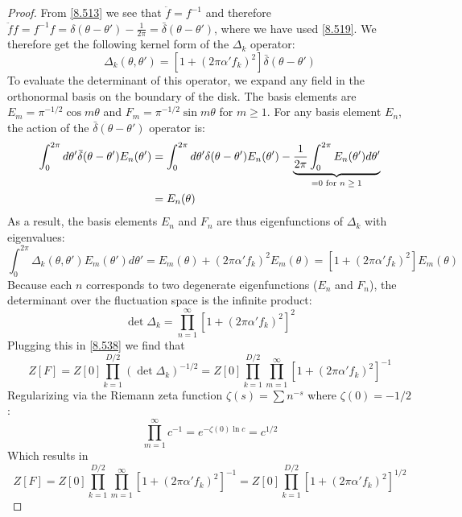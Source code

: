 \begin{tcolorbox}[breakable]
\begin{proof}
			From \eqref{8.513} we see that $\ddot{f} = f^{-1}$ and therefore $\ddot{f} f = f^{-1} f = \delta(\theta - \theta') - \frac{1}{2\pi} = \bar{\delta}(\theta - \theta')$, where we have used \eqref{8.519}. We therefore get the following kernel form of the $\Delta_k$ operator:
			\begin{equation}
				\Delta_k(\theta, \theta') = [1+ (2\pi\alpha' f_k)^2] \bar{\delta}(\theta - \theta')
			\end{equation}
			To evaluate the determinant of this operator, we expand any field in the orthonormal basis on the boundary of the disk. The basis elements are $E_m = \pi^{-1/2} \cos m\theta$ and $F_m = \pi^{-1/2} \sin m\theta$ for $m \ge 1$. For any basis element $E_n$, the action of the $\bar{\delta}(\theta - \theta')$ operator is:
			\begin{align}
				\int_0^{2\pi} d\theta' \bar{\delta}(\theta - \theta') E_n(\theta') &= \int_0^{2\pi} d\theta' \delta(\theta - \theta') E_n(\theta') -\underbrace{ \frac{1}{2\pi} \int_0^{2\pi} E_n(\theta') d\theta'}_{=0 \text{ for $n\ge1$}}\notag\\
				&=E_n(\theta)
			\end{align}
			As a result, the basis elements $E_n$ and $F_n$ are thus eigenfunctions of $\Delta_k$ with eigenvalues:
			\begin{equation}
			\int_0^{2\pi} \Delta_k(\theta, \theta') E_m(\theta') d\theta' = E_m(\theta) + (2\pi\alpha' f_k)^2 E_m(\theta) = [1 + (2\pi\alpha' f_k)^2] E_m(\theta)
			\end{equation}
			Because each $n$ corresponds to two degenerate eigenfunctions ($E_n$ and $F_n$), the determinant over the fluctuation space is the infinite product:
			\begin{equation}
				\det \Delta_k = \prod_{n=1}^{\infty} [1 + (2\pi\alpha' f_k)^2]^2
			\end{equation}
			Plugging this in \eqref{8.538} we find that
			\begin{equation}
				Z[F] = Z[0] \prod_{k=1}^{D/2} (\det \Delta_k)^{-1/2} = Z[0] \prod_{k=1}^{D/2} \prod_{m=1}^{\infty} [1 + (2\pi\alpha' f_k)^2]^{-1}
			\end{equation}
			Regularizing via the Riemann zeta function $\zeta(s) = \sum n^{-s}$ where $\zeta(0) = -1/2$:
			\begin{equation}
				\prod_{m=1}^\infty c^{-1} = e^{ - \zeta(0) \ln c } = c^{1/2} 
			\end{equation}
			Which results in
			\begin{equation}
				Z[F]= Z[0] \prod_{k=1}^{D/2} \prod_{m=1}^{\infty} [1 + (2\pi\alpha' f_k)^2]^{-1} = Z[0] \prod_{k=1}^{D/2} [ 1 + (2\pi \alpha' f_k)^2 ]^{1/2}

\end{equation}
\end{proof}
\end{tcolorbox}
